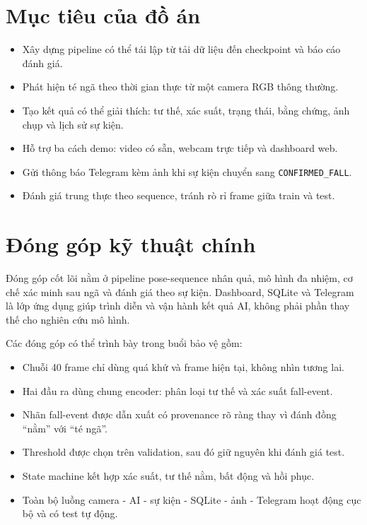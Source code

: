 \documentclass[12pt,a4paper,oneside]{report}
\newcommand{\code}[1]{\texttt{#1}}
\begin{document}
\section{Mục tiêu của đồ án}

\begin{itemize}
  \item Xây dựng pipeline có thể tái lập từ tải dữ liệu đến checkpoint và báo cáo
  đánh giá.
  \item Phát hiện té ngã theo thời gian thực từ một camera RGB thông thường.
  \item Tạo kết quả có thể giải thích: tư thế, xác suất, trạng thái, bằng chứng,
  ảnh chụp và lịch sử sự kiện.
  \item Hỗ trợ ba cách demo: video có sẵn, webcam trực tiếp và dashboard web.
  \item Gửi thông báo Telegram kèm ảnh khi sự kiện chuyển sang
  \code{CONFIRMED\_FALL}.
  \item Đánh giá trung thực theo sequence, tránh rò rỉ frame giữa train và test.
\end{itemize}

\section{Đóng góp kỹ thuật chính}

\begin{summarybox}
Đóng góp cốt lõi nằm ở pipeline pose-sequence nhân quả, mô hình đa nhiệm, cơ chế
xác minh sau ngã và đánh giá theo sự kiện. Dashboard, SQLite và Telegram là lớp
ứng dụng giúp trình diễn và vận hành kết quả AI, không phải phần thay thế cho
nghiên cứu mô hình.
\end{summarybox}

Các đóng góp có thể trình bày trong buổi bảo vệ gồm:

\begin{itemize}
  \item Chuỗi 40 frame chỉ dùng quá khứ và frame hiện tại, không nhìn tương lai.
  \item Hai đầu ra dùng chung encoder: phân loại tư thế và xác suất fall-event.
  \item Nhãn fall-event được dẫn xuất có provenance rõ ràng thay vì đánh đồng
  ``nằm'' với ``té ngã''.
  \item Threshold được chọn trên validation, sau đó giữ nguyên khi đánh giá test.
  \item State machine kết hợp xác suất, tư thế nằm, bất động và hồi phục.
  \item Toàn bộ luồng camera - AI - sự kiện - SQLite - ảnh - Telegram hoạt động
  cục bộ và có test tự động.
\end{itemize}
\end{document}
